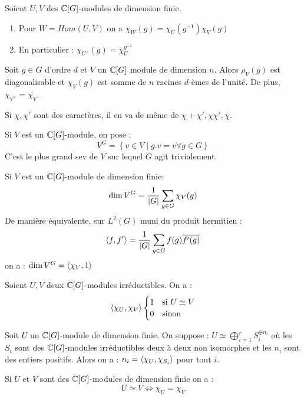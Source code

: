 \documentclass{cours}
\begin{document}
\begin{proposition}
    Soient $U, V$ des $\mathbb{C}[G]$-modules de dimension finie.
    \begin{enumerate}
        \item Pour $W = Hom(U, V)$ on a $\chi_{W}(g) = \chi_{U}(g^{-1})\chi_{V}(g)$
        \item En particulier : $\chi_{U^{\lor}}(g) = \chi_{U}^{g^{-1}}$
    \end{enumerate}
\end{proposition}
\begin{proposition}
    Soit $g \in G$ d'ordre $d$ et $V$ un $\mathbb{C}[G]$ module de dimension $n$. Alors $\rho_{V}(g)$ est diagonalisable et $\chi_{V}(g)$ est somme de $n$ racines $d$-èmes de l'unité. De plus, $\chi_{V^{\lor}} = \overline{\chi_{V}}$.
\end{proposition}

\begin{corollary}
    Si $\chi, \chi'$ sont des caractères, il en va de même de $\chi + \chi', \chi\chi', \overline{\chi}$.
\end{corollary}

\begin{definition}
    Si $V$ est un $\mathbb{C}[G]$-module, on pose :
    \[
        V^{G} = \left\{v\in V \mid g.v = v \forall g \in G\right\}
    \]
    C'est le plus grand sev de $V$ sur lequel $G$ agit trivialement.
\end{definition}

\begin{lemma}
    Si $V$ est un $\mathbb{C}[G]$-module de dimension finie:
    \[
        \dim V^{G} = \frac{1}{\left|G\right|} \sum_{g \in G}\chi_{V}(g)
    \]
    De manière équivalente, sur $L^{2}(G)$ muni du produit hermitien :
    \[
        \left\langle f, f' \right\rangle = \frac{1}{\left|G\right|}\sum_{g \in G}f(g)\overline{f'(g)}
    \]
    on a : $\dim V^{G} = \left\langle \chi_{V}, 1 \right\rangle$
\end{lemma}

\begin{theorem}
    Soient $U, V$ deux $\mathbb{C}[G]$-modules irréductibles. On a :
    \[
        \left\langle \chi_{U}, \chi_{V} \right\rangle \begin{cases}
            1 & \text{si } U \simeq V \\
            0 & \text{sinon}
        \end{cases}
    \]
\end{theorem}
\begin{corollary}
    Soit $U$ un $\mathbb{C}[G]$-module de dimension finie. On suppose : $U \simeq \bigoplus_{i = 1}^{r} S_{i}^{\oplus n_{i}}$
    où les $S_{i}$ sont des $\mathbb{C}[G]$-modules irréductibles deux à deux non isomorphes et les $n_{i}$ sont des entiers positifs.
    Alors on a : $n_{i} = \left\langle \chi_{U}, \chi_{S_{i}} \right\rangle$ pour tout $i$.
\end{corollary}
\begin{corollary}
    Si $U$ et $V$ sont des $\mathbb{C}[G]$-modules de dimension finie on a :
    \[
        U \simeq V \Longleftrightarrow \chi_{U} = \chi_{V}
    \]
\end{corollary}
\end{document}

